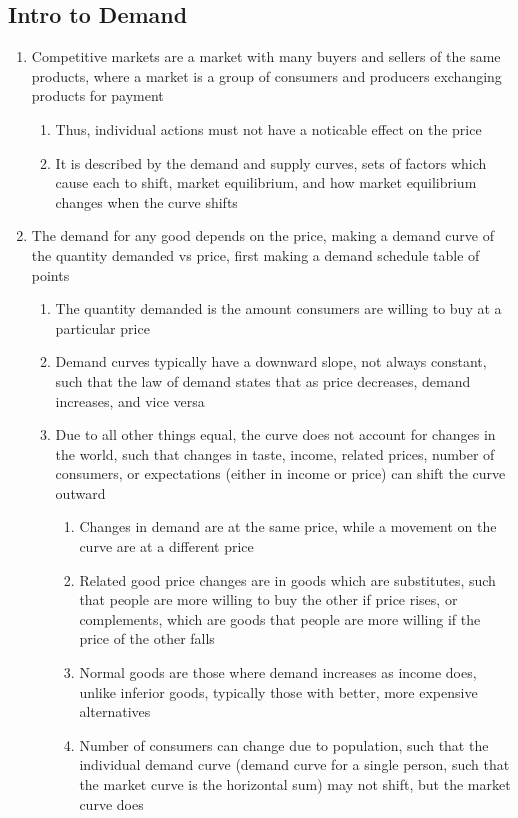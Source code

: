 \documentclass[11 pt, twoside]{article}
\begin{document}
\subsection{Intro to Demand}
\begin{enumerate}
\item Competitive markets are a market with many buyers and sellers of the same products, where a market is a group of consumers and producers exchanging products for payment
\begin{enumerate}
\item Thus, individual actions must not have a noticable effect on the price
\item It is described by the demand and supply curves, sets of factors which cause each to shift, market equilibrium, and how market equilibrium changes when the curve shifts
\end{enumerate}
\item The demand for any good depends on the price, making a demand curve of the quantity demanded vs price, first making a demand schedule table of points
\begin{enumerate}
\item The quantity demanded is the amount consumers are willing to buy at a particular price
\item Demand curves typically have a downward slope, not always constant, such that the law of demand states that as price decreases, demand increases, and vice versa
\item Due to all other things equal, the curve does not account for changes in the world, such that changes in taste, income, related prices, number of consumers, or expectations (either in income or price) can shift the curve outward
\begin{enumerate}
\item Changes in demand are at the same price, while a movement on the curve are at a different price
\item Related good price changes are in goods which are substitutes, such that people are more willing to buy the other if price rises, or complements, which are goods that people are more willing if the price of the other falls
\item Normal goods are those where demand increases as income does, unlike inferior goods, typically those with better, more expensive alternatives
\item Number of consumers can change due to population, such that the individual demand curve (demand curve for a single person, such that the market curve is the horizontal sum) may not shift, but the market curve does 
\end{enumerate}
\end{enumerate}
\end{enumerate}
\end{document}
